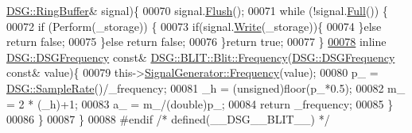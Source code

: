 \begin{DoxyCode}
      \hyperlink{class_d_s_g_1_1_ring_buffer}{DSG::RingBuffer}& signal)\{
00070             signal.\hyperlink{class_d_s_g_1_1_ring_buffer_ab23c8003d2857809a816068eeb209d60}{Flush}();
00071             \textcolor{keywordflow}{while} (!signal.\hyperlink{class_d_s_g_1_1_ring_buffer_a53ddb04ffcbb5470a8d2b0a3c65b70cb}{Full}()) \{
00072                 \textcolor{keywordflow}{if} (Perform(\_storage)) \{
00073                     \textcolor{keywordflow}{if}(signal.\hyperlink{class_d_s_g_1_1_ring_buffer_aa5dd2caa0a270173251faee40a43d692}{Write}(\_storage))\{
00074                     \}\textcolor{keywordflow}{else} \textcolor{keywordflow}{return} \textcolor{keyword}{false};
00075                 \}\textcolor{keywordflow}{else} \textcolor{keywordflow}{return} \textcolor{keyword}{false};
00076             \}\textcolor{keywordflow}{return} \textcolor{keyword}{true};
00077         \}
\hypertarget{_b_l_i_t_8h_source_l00078}{}\hyperlink{class_d_s_g_1_1_b_l_i_t_1_1_blit_a933f8f9f324a4fde4f9e2b69473d88ed}{00078}         \textcolor{keyword}{inline} \hyperlink{namespace_d_s_g_a4315a061386fa1014fda09b15d3a6973}{DSG::DSGFrequency} \textcolor{keyword}{const}& 
      \hyperlink{class_d_s_g_1_1_signal_generator_a4e6b3c43e76e53f8cd337ad699c464cb}{DSG::BLIT::Blit::Frequency}(\hyperlink{namespace_d_s_g_a4315a061386fa1014fda09b15d3a6973}{DSG::DSGFrequency} \textcolor{keyword}{const}& value)\{
00079             this->\hyperlink{class_d_s_g_1_1_signal_generator_a4e6b3c43e76e53f8cd337ad699c464cb}{SignalGenerator::Frequency}(value);
00080             p\_ = \hyperlink{namespace_d_s_g_a72df05177db0412c3590070923f62819}{DSG::SampleRate}()/\_frequency;
00081             \_h = (unsigned)floor(p\_*0.5);
00082             m\_ = 2 * (\_h)+1;
00083             a\_ = m\_/(double)p\_;
00084             \textcolor{keywordflow}{return} \_frequency;
00085         \}
00086     \}
00087 \}
00088 \textcolor{preprocessor}{#endif }\textcolor{comment}{/* defined(\_\_DSG\_\_BLIT\_\_) */}\textcolor{preprocessor}{}
\end{DoxyCode}
